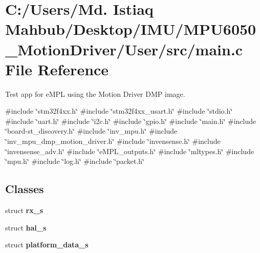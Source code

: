 \section{C\+:/\+Users/\+Md. Istiaq Mahbub/\+Desktop/\+I\+M\+U/\+M\+P\+U6050\+\_\+\+Motion\+Driver/\+User/src/main.c File Reference}
\label{main_8c}


Test app for e\+M\+PL using the Motion Driver D\+MP image.  


{\ttfamily \#include \char`\"{}stm32f4xx.\+h\char`\"{}}\newline
{\ttfamily \#include \char`\"{}stm32f4xx\+\_\+usart.\+h\char`\"{}}\newline
{\ttfamily \#include \char`\"{}stdio.\+h\char`\"{}}\newline
{\ttfamily \#include \char`\"{}uart.\+h\char`\"{}}\newline
{\ttfamily \#include \char`\"{}i2c.\+h\char`\"{}}\newline
{\ttfamily \#include \char`\"{}gpio.\+h\char`\"{}}\newline
{\ttfamily \#include \char`\"{}main.\+h\char`\"{}}\newline
{\ttfamily \#include \char`\"{}board-\/st\+\_\+discovery.\+h\char`\"{}}\newline
{\ttfamily \#include \char`\"{}inv\+\_\+mpu.\+h\char`\"{}}\newline
{\ttfamily \#include \char`\"{}inv\+\_\+mpu\+\_\+dmp\+\_\+motion\+\_\+driver.\+h\char`\"{}}\newline
{\ttfamily \#include \char`\"{}invensense.\+h\char`\"{}}\newline
{\ttfamily \#include \char`\"{}invensense\+\_\+adv.\+h\char`\"{}}\newline
{\ttfamily \#include \char`\"{}e\+M\+P\+L\+\_\+outputs.\+h\char`\"{}}\newline
{\ttfamily \#include \char`\"{}mltypes.\+h\char`\"{}}\newline
{\ttfamily \#include \char`\"{}mpu.\+h\char`\"{}}\newline
{\ttfamily \#include \char`\"{}log.\+h\char`\"{}}\newline
{\ttfamily \#include \char`\"{}packet.\+h\char`\"{}}\newline
\subsection*{Classes}
\begin{DoxyCompactItemize}
\item 
struct \textbf{ rx\+\_\+s}
\item 
struct \textbf{ hal\+\_\+s}
\item 
struct \textbf{ platform\+\_\+data\+\_\+s}
\end{DoxyCompactItemize}
